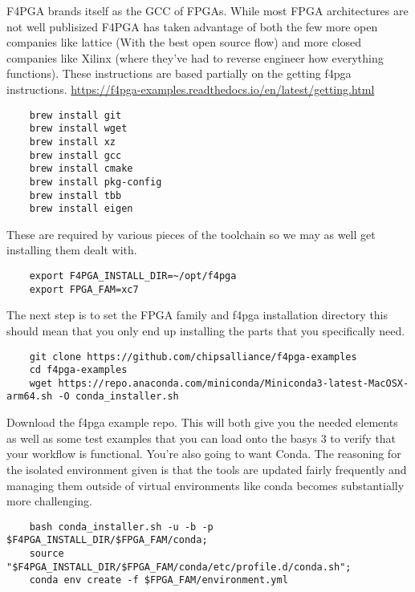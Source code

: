 F4PGA brands itself as the GCC of FPGAs. 
While most FPGA architectures are not well publisized F4PGA has taken advantage of both the few more open companies like lattice 
(With the best open source flow) and more closed companies like Xilinx (where they've had to reverse engineer how everything functions).
These instructions are based partially on the getting f4pga instructions. \href{https://f4pga-examples.readthedocs.io/en/latest/getting.html}{https://f4pga-examples.readthedocs.io/en/latest/getting.html}
\begin{verbatim}
    brew install git
    brew install wget
    brew install xz
    brew install gcc
    brew install cmake
    brew install pkg-config
    brew install tbb
    brew install eigen

\end{verbatim}

These are required by various pieces of the toolchain so we may as well get installing them dealt with.

\begin{verbatim}
    export F4PGA_INSTALL_DIR=~/opt/f4pga
    export FPGA_FAM=xc7
\end{verbatim}

The next step is to set the FPGA family and f4pga installation directory this should mean that you only end up installing the parts that you specifically need.

\begin{verbatim}
    git clone https://github.com/chipsalliance/f4pga-examples
    cd f4pga-examples
    wget https://repo.anaconda.com/miniconda/Miniconda3-latest-MacOSX-arm64.sh -O conda_installer.sh
\end{verbatim}

Download the f4pga example repo. This will both give you the needed elements as well as some test examples that you can load onto the basys 3 to verify that your workflow is functional.
You're also going to want Conda. The reasoning for the isolated environment given is that the tools are updated fairly frequently and managing them outside of virtual environments like conda becomes substantially more challenging.

\begin{verbatim}
    bash conda_installer.sh -u -b -p $F4PGA_INSTALL_DIR/$FPGA_FAM/conda;
    source "$F4PGA_INSTALL_DIR/$FPGA_FAM/conda/etc/profile.d/conda.sh";
    conda env create -f $FPGA_FAM/environment.yml    
\end{verbatim}

